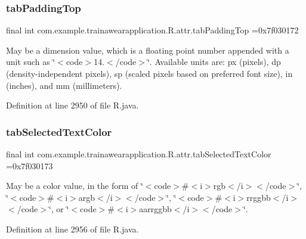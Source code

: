 \subsubsection{\texorpdfstring{tabPaddingTop}{tabPaddingTop}}
{\footnotesize\ttfamily final int com.\+example.\+trainawearapplication.\+R.\+attr.\+tab\+Padding\+Top =0x7f030172\hspace{0.3cm}{\ttfamily [static]}}

May be a dimension value, which is a floating point number appended with a unit such as \char`\"{}$<$code$>$14.\+5sp$<$/code$>$\char`\"{}. Available units are\+: px (pixels), dp (density-\/independent pixels), sp (scaled pixels based on preferred font size), in (inches), and mm (millimeters). 

Definition at line 2950 of file R.\+java.

\mbox{\label{classcom_1_1example_1_1trainawearapplication_1_1_r_1_1attr_af7c545616ba0518eba8b3b1d51d9ed3f}} 
\subsubsection{\texorpdfstring{tabSelectedTextColor}{tabSelectedTextColor}}
{\footnotesize\ttfamily final int com.\+example.\+trainawearapplication.\+R.\+attr.\+tab\+Selected\+Text\+Color =0x7f030173\hspace{0.3cm}{\ttfamily [static]}}

May be a color value, in the form of \char`\"{}$<$code$>$\#$<$i$>$rgb$<$/i$>$$<$/code$>$\char`\"{}, \char`\"{}$<$code$>$\#$<$i$>$argb$<$/i$>$$<$/code$>$\char`\"{}, \char`\"{}$<$code$>$\#$<$i$>$rrggbb$<$/i$>$$<$/code$>$\char`\"{}, or \char`\"{}$<$code$>$\#$<$i$>$aarrggbb$<$/i$>$$<$/code$>$\char`\"{}. 

Definition at line 2956 of file R.\+java.

\mbox{\label{classcom_1_1example_1_1trainawearapplication_1_1_r_1_1attr_a476079ef276d01b45e947ae8af3e7163}} 
